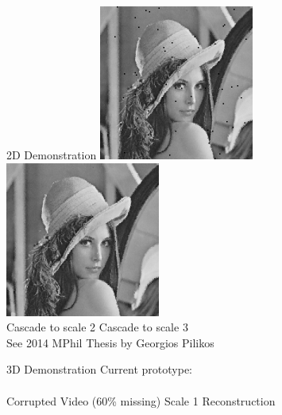 \documentclass[xcolor=table]{beamer}
\numberwithin{equation}{section}
\begin{document}
\begin{frame}{2D Demonstration}
\includegraphics[width=2in,height=2in]{L2.png}
\hspace{0.2in}
\includegraphics[width=2in,height=2in]{L3.png}\\
\hspace{0.4in} Cascade to scale 2 \hspace{1in} Cascade to scale 3\\
\vspace{0.2in}
See 2014 MPhil Thesis by Georgios Pilikos
\end{frame}

\begin{frame}{3D Demonstration}
\hspace{1.8in}Current prototype:\\
\,
\\
\hspace{0.1in} Corrupted Video (60\% missing) \hspace{0.5in} Scale 1 Reconstruction \\
\end{frame}
\end{document}
